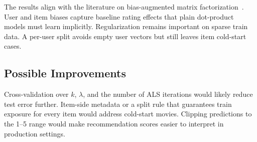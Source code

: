 \documentclass[conference]{IEEEtran}
\begin{document}
The results align with the literature on bias-augmented matrix factorization~\cite{ref1,ref2}. User and item biases capture baseline rating effects that plain dot-product models must learn implicitly. Regularization remains important on sparse train data. A per-user split avoids empty user vectors but still leaves item cold-start cases.

\subsection{Possible Improvements}

Cross-validation over $k$, $\lambda$, and the number of ALS iterations would likely reduce test error further. Item-side metadata or a split rule that guarantees train exposure for every item would address cold-start movies. Clipping predictions to the 1--5 range would make recommendation scores easier to interpret in production settings.
\end{document}

